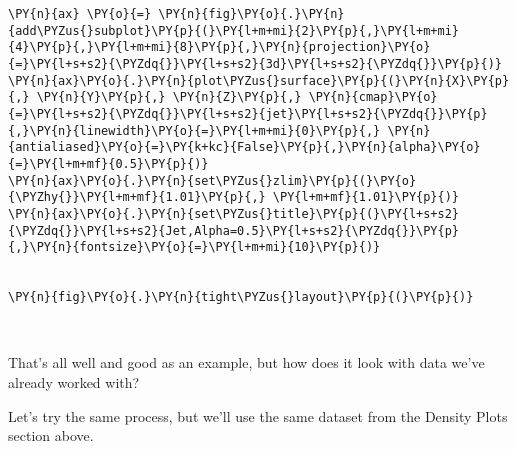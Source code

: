 \begin{tcolorbox}[breakable, size=fbox, boxrule=1pt, pad at break*=1mm,colback=cellbackground, colframe=cellborder]
\begin{Verbatim}[commandchars=\\\{\}]
\PY{n}{ax} \PY{o}{=} \PY{n}{fig}\PY{o}{.}\PY{n}{add\PYZus{}subplot}\PY{p}{(}\PY{l+m+mi}{2}\PY{p}{,}\PY{l+m+mi}{4}\PY{p}{,}\PY{l+m+mi}{8}\PY{p}{,}\PY{n}{projection}\PY{o}{=}\PY{l+s+s2}{\PYZdq{}}\PY{l+s+s2}{3d}\PY{l+s+s2}{\PYZdq{}}\PY{p}{)}
\PY{n}{ax}\PY{o}{.}\PY{n}{plot\PYZus{}surface}\PY{p}{(}\PY{n}{X}\PY{p}{,} \PY{n}{Y}\PY{p}{,} \PY{n}{Z}\PY{p}{,} \PY{n}{cmap}\PY{o}{=}\PY{l+s+s2}{\PYZdq{}}\PY{l+s+s2}{jet}\PY{l+s+s2}{\PYZdq{}}\PY{p}{,}\PY{n}{linewidth}\PY{o}{=}\PY{l+m+mi}{0}\PY{p}{,} \PY{n}{antialiased}\PY{o}{=}\PY{k+kc}{False}\PY{p}{,}\PY{n}{alpha}\PY{o}{=}\PY{l+m+mf}{0.5}\PY{p}{)}
\PY{n}{ax}\PY{o}{.}\PY{n}{set\PYZus{}zlim}\PY{p}{(}\PY{o}{\PYZhy{}}\PY{l+m+mf}{1.01}\PY{p}{,} \PY{l+m+mf}{1.01}\PY{p}{)}
\PY{n}{ax}\PY{o}{.}\PY{n}{set\PYZus{}title}\PY{p}{(}\PY{l+s+s2}{\PYZdq{}}\PY{l+s+s2}{Jet,Alpha=0.5}\PY{l+s+s2}{\PYZdq{}}\PY{p}{,}\PY{n}{fontsize}\PY{o}{=}\PY{l+m+mi}{10}\PY{p}{)}


\PY{n}{fig}\PY{o}{.}\PY{n}{tight\PYZus{}layout}\PY{p}{(}\PY{p}{)}
\end{Verbatim}
\end{tcolorbox}

    \begin{center}
    \end{center}
    { \hspace*{\fill} \\}
    
    That's all well and good as an example, but how does it look with data
we've already worked with?

Let's try the same process, but we'll use the same dataset from the
Density Plots section above.

